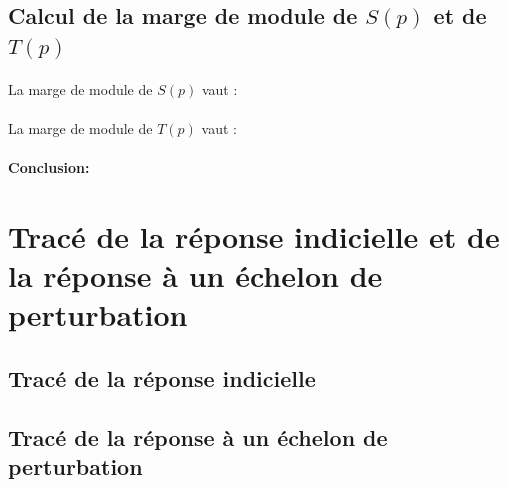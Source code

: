 \documentclass[12pt, a4paper, openany]{report}
\begin{document}
 \begin{center}
     \label{fig18}
 \end{center}
   
   \subsection{Calcul de la marge de module de $S(p)$\hspace{1mm} et de \hspace{1mm}$T(p)$} 
 
   \paragraph{}
   La marge de module de $S(p)$ vaut :
   
   \paragraph{}
   La marge de module de $T(p)$ vaut :
   
   \paragraph{}
\textbf{Conclusion:} %

  \section{ Tracé de la réponse indicielle et de la réponse à un échelon de perturbation}
  
  \subsection{Tracé de la réponse indicielle}
  
  \begin{center}
     \label{fig18}
 \end{center}
  
  \subsection{Tracé de la réponse à un échelon de perturbation} 

\begin{center}
     \label{fig19}
 \end{center}
  
\end{document}
